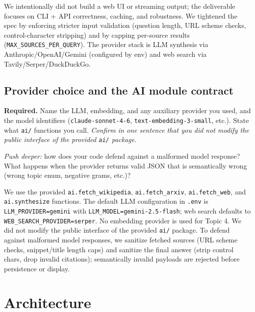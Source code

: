 \documentclass[11pt,a4paper]{article}
\begin{document}
We intentionally did not build a web UI or streaming output; the deliverable focuses on CLI + API correctness, caching, and robustness. We tightened the spec by enforcing stricter input validation (question length, URL scheme checks, control-character stripping) and by capping per-source results (\texttt{MAX\_SOURCES\_PER\_QUERY}). The provider stack is LLM synthesis via Anthropic/OpenAI/Gemini (configured by env) and web search via Tavily/Serper/DuckDuckGo.

\subsection{Provider choice and the AI module contract}

\begin{deliverbox}
\textbf{Required.} Name the LLM, embedding, and any auxiliary provider you used, and the model identifiers (\texttt{claude-sonnet-4-6}, \texttt{text-embedding-3-small}, etc.). State what \texttt{ai/} functions you call. \emph{Confirm in one sentence that you did not modify the public interface of the provided \texttt{ai/} package.}
\end{deliverbox}

\begin{probebox}
\textit{Push deeper:} how does your code defend against a malformed model response? What happens when the provider returns valid JSON that is semantically wrong (wrong topic enum, negative grams, etc.)?
\end{probebox}

We use the provided \texttt{ai.fetch\_wikipedia}, \texttt{ai.fetch\_arxiv}, \texttt{ai.fetch\_web}, and \texttt{ai.synthesize} functions. The default LLM configuration in \texttt{.env} is \texttt{LLM\_PROVIDER=gemini} with \texttt{LLM\_MODEL=gemini-2.5-flash}; web search defaults to \texttt{WEB\_SEARCH\_PROVIDER=serper}. No embedding provider is used for Topic 4. We did not modify the public interface of the provided \texttt{ai/} package. To defend against malformed model responses, we sanitize fetched sources (URL scheme checks, snippet/title length caps) and sanitize the final answer (strip control chars, drop invalid citations); semantically invalid payloads are rejected before persistence or display.

\section{Architecture}\label{sec:arch}
\end{document}
